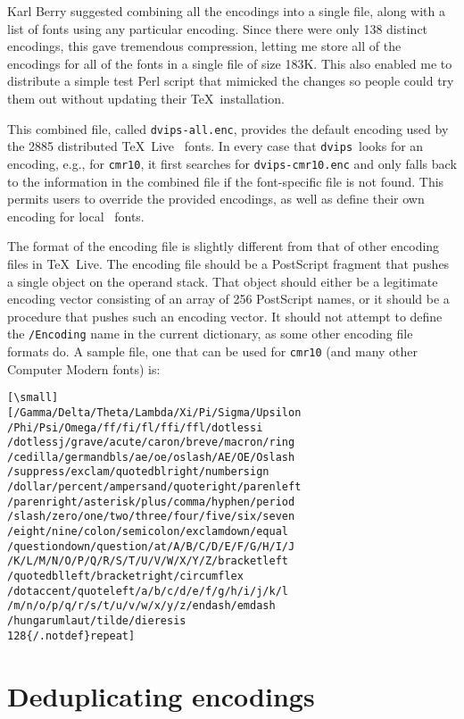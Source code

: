 \documentclass[final]{ltugboat}
\def\dvips{\texttt{dvips}}
\begin{document}
Karl Berry suggested combining all the encodings into a single
file, along with a list of fonts using any particular encoding.
Since there were only 138 distinct encodings, this gave
tremendous compression, letting me store all of the encodings
for all of the fonts in a single file of size 183K.  This also
enabled me to distribute a simple test Perl script that mimicked
the changes so people could try them out without updating their
\TeX\ installation.

This combined file, called \texttt{dvips-all.enc}, provides
the default encoding used by the 2885 distributed \TeX~Live
\MF\ fonts.  In every case that \dvips\ looks for an encoding,
e.g., for \texttt{cmr10}, it first searches for \texttt{dvips-cmr10.enc}
and only falls back to the information in the combined file if
the font-specific file is not found.  This permits users to override
the provided encodings, as well as define their
own encoding for local \MF\ fonts.

The format of the encoding file is slightly different from that
of other encoding files in \TeX~Live.  The
encoding file should be a PostScript fragment that pushes a
single object on the operand stack.  That object should either be a
legitimate encoding vector consisting of an array of 256
PostScript names, or it should be a procedure that pushes
such an encoding vector.  It should not attempt to define
the \texttt{/Encoding} name in the current dictionary, as some other
encoding file formats do.  A sample file, one that can be used
for \texttt{cmr10} (and many other Computer Modern fonts) is:

\begin{verbatim}[\small]
[/Gamma/Delta/Theta/Lambda/Xi/Pi/Sigma/Upsilon
/Phi/Psi/Omega/ff/fi/fl/ffi/ffl/dotlessi
/dotlessj/grave/acute/caron/breve/macron/ring
/cedilla/germandbls/ae/oe/oslash/AE/OE/Oslash
/suppress/exclam/quotedblright/numbersign
/dollar/percent/ampersand/quoteright/parenleft
/parenright/asterisk/plus/comma/hyphen/period
/slash/zero/one/two/three/four/five/six/seven
/eight/nine/colon/semicolon/exclamdown/equal
/questiondown/question/at/A/B/C/D/E/F/G/H/I/J
/K/L/M/N/O/P/Q/R/S/T/U/V/W/X/Y/Z/bracketleft
/quotedblleft/bracketright/circumflex
/dotaccent/quoteleft/a/b/c/d/e/f/g/h/i/j/k/l
/m/n/o/p/q/r/s/t/u/v/w/x/y/z/endash/emdash
/hungarumlaut/tilde/dieresis
128{/.notdef}repeat]
\end{verbatim}

\section{Deduplicating encodings}
\end{document}
